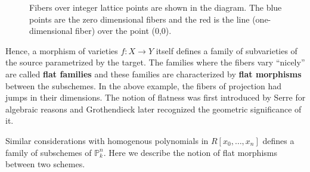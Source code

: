 \documentclass[12pt]{article}
\theoremstyle{mytheoremstyle}
\newcommand{\bP}{\mathbb{P}}
\begin{document}
\begin{figure}
    \label{fig:M1}
    \caption{Fibers over integer lattice points are shown in the diagram. The blue points are the zero dimensional fibers and the red
        is the line (one-dimensional fiber) over the point (0,0).}
\end{figure}

\hspace*{8mm}Hence, a morphism of varieties $f\colon X\to Y$ itself defines a family of subvarieties
of the source parametrized by the target. The families where the
fibers vary ``nicely'' are called \textbf{flat families} and these
families are characterized by \textbf{flat morphisms} between
the subschemes. In the above example, the fibers of projection had
jumps in their dimensions.
The notion of flatness was first introduced by
Serre for algebraic reasons and Grothendieck later recognized the
geometric significance of it.\cite{vakil2023foundations}

\vspace*{2mm}
\hspace*{8mm}Similar considerations with homogenous polynomials
in $R[x_0,\ldots,x_n]$
defines a family of subschemes of $\bP^n_k$.
Here we describe the notion of flat morphisms
between two schemes.
\end{document}
